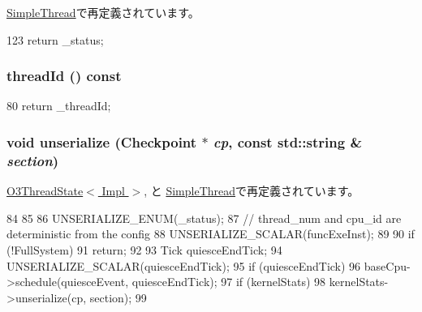 \hyperlink{classSimpleThread_a2ad9e92a82d6f783b3061584729c2f4a}{SimpleThread}で再定義されています。


\begin{DoxyCode}
123 { return _status; }
\end{DoxyCode}
\hypertarget{structThreadState_a1df6a20d1f58735daa08de45c9ea6a7a}{
\subsubsection[{threadId}]{ threadId () const}}
\label{structThreadState_a1df6a20d1f58735daa08de45c9ea6a7a}



\begin{DoxyCode}
80 { return _threadId; }
\end{DoxyCode}
\hypertarget{structThreadState_af22e5d6d660b97db37003ac61ac4ee49}{
\subsubsection[{unserialize}]{\setlength{\rightskip}{0pt plus 5cm}void unserialize ({\bf Checkpoint} $\ast$ {\em cp}, \/  const std::string \& {\em section})}}
\label{structThreadState_af22e5d6d660b97db37003ac61ac4ee49}


\hyperlink{structO3ThreadState_af22e5d6d660b97db37003ac61ac4ee49}{O3ThreadState$<$ Impl $>$}, と \hyperlink{classSimpleThread_af22e5d6d660b97db37003ac61ac4ee49}{SimpleThread}で再定義されています。


\begin{DoxyCode}
84 {
85 
86     UNSERIALIZE_ENUM(_status);
87     // thread_num and cpu_id are deterministic from the config
88     UNSERIALIZE_SCALAR(funcExeInst);
89 
90     if (!FullSystem)
91         return;
92 
93     Tick quiesceEndTick;
94     UNSERIALIZE_SCALAR(quiesceEndTick);
95     if (quiesceEndTick)
96         baseCpu->schedule(quiesceEvent, quiesceEndTick);
97     if (kernelStats)
98         kernelStats->unserialize(cp, section);
99 }
\end{DoxyCode}


